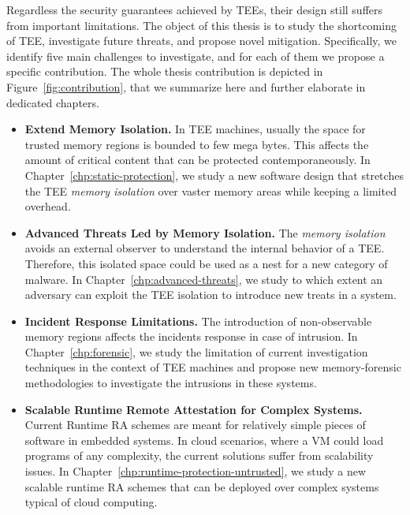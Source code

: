 Regardless the security guarantees achieved by TEEs, their design still 
suffers from important limitations.
The object of this thesis is to study the shortcoming of TEE, 
investigate future threats, and propose novel mitigation.
Specifically, we identify five main challenges to investigate, and for each of 
them we propose a specific contribution.
The whole thesis contribution is depicted in 
Figure~\ref{fig:contribution}, that we summarize here and further elaborate in 
dedicated chapters.

\begin{itemize}
	\item[\circledrA{1}] \textbf{Extend Memory Isolation.}
	In TEE machines, usually the space for trusted memory regions is bounded 
	to few mega bytes. 
	This affects the amount of critical content that can be protected 	
	contemporaneously.
	In Chapter~\ref{chp:static-protection}, we study a new software design that 
	stretches the TEE \emph{memory isolation} over vaster memory areas while 
	keeping a limited overhead.
	
	\item[\circledrA{2}] \textbf{Advanced Threats Led by Memory Isolation.} The 
	\emph{memory isolation} avoids an external observer to understand the 
	internal behavior of a TEE. Therefore, this isolated space could 
	be used as a nest for a new category of malware.
	In Chapter~\ref{chp:advanced-threats}, we study to which extent an 
	adversary can exploit the TEE isolation to introduce new treats in a system.

	\item[\circledrA{3}]
	\textbf{Incident Response Limitations.} The introduction of 
	non-observable memory regions affects the incidents response in 
	case of intrusion.
	In Chapter~\ref{chp:forensic}, we study the limitation of current 
	investigation techniques in the context of TEE machines and propose new 
	memory-forensic methodologies to investigate the intrusions in these 
	systems.
	
	\item[\circledrA{4}]
	\textbf{Scalable Runtime Remote Attestation for Complex Systems.}
	Current Runtime RA schemes are meant for relatively simple pieces of 
	software in embedded systems.
	In cloud scenarios, where a VM could load programs of any complexity, the 
	current solutions suffer from scalability issues.
	In Chapter~\ref{chp:runtime-protection-untrusted}, we study a new scalable 
	runtime RA schemes that can be deployed over 
	complex systems typical of cloud computing.
	

\end{itemize}
